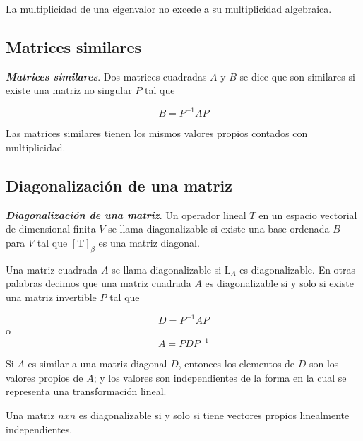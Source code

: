 \documentclass{report}
\begin{document}
    \begin{thBox}
        La multiplicidad de una eigenvalor no excede a su multiplicidad algebraica.
    \end{thBox}
    
    \subsection*{Matrices similares}
    
    \begin{defBox}
        \textit{\textbf{Matrices similares}}. Dos matrices cuadradas $A$ y $B$ se dice que son similares si existe una matriz no singular $P$ tal que

        $$B = P^{-1}AP$$
    \end{defBox}
    
    \begin{thBox}
        Las matrices similares tienen los mismos valores propios contados con multiplicidad.
    \end{thBox}
    
    \subsection*{Diagonalización de una matriz}
    
    \begin{defBox}
        \textit{\textbf{Diagonalización de una matriz}}. Un operador lineal $T$ en un espacio vectorial de dimensional finita $V$ se llama diagonalizable si existe una base ordenada $B$ para $V$ tal que $[\mathrm{T}]_\beta$ es una matriz diagonal.

        Una matriz cuadrada $A$ se llama diagonalizable si $\mathrm{L}_A$ es diagonalizable. En otras palabras decimos que una matriz cuadrada $A$ es diagonalizable si y solo si existe una matriz invertible $P$ tal que

        $$D = P^{-1}AP$$ o
        $$A = PDP^{-1}$$
    \end{defBox}
    
    \begin{thBox}
        Si $A$ es similar a una matriz diagonal $D$, entonces los elementos de $D$ son los valores propios de $A$; y los valores son independientes de la forma en la cual se representa una transformación lineal.
    \end{thBox}
    
    \begin{thBox}
        Una matriz $nxn$ es diagonalizable si y solo si tiene vectores propios linealmente independientes.
    \end{thBox}
    
\end{document}

